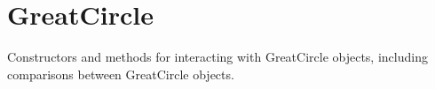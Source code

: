 \documentclass[letterpaper,10pt,english]{sphinxmanual}
\begin{document}
\begin{fulllineitems}
\begin{fulllineitems}
\begin{quote}
\begin{description}
\end{description}\end{quote}

\end{fulllineitems}


\end{fulllineitems}


\section{GreatCircle}
\label{\detokenize{users_guide:greatcircle}}\label{\detokenize{users_guide:module-GeoSpatialTools.great_circle}}
\sphinxAtStartPar
Constructors and methods for interacting with GreatCircle objects, including
comparisons between GreatCircle objects.
\end{document}
